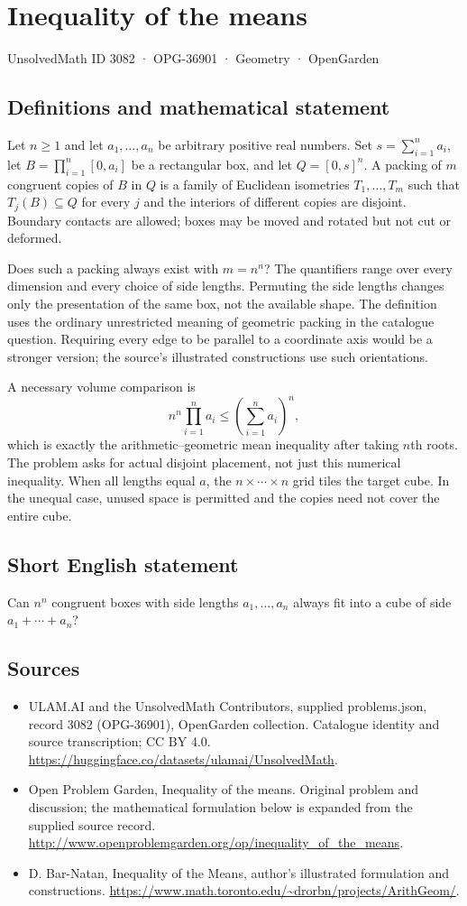 \documentclass[11pt,a4paper]{article}
\begin{document}
\section*{Inequality of the means}\label{3082}
{\small UnsolvedMath ID 3082 · OPG-36901 · Geometry · OpenGarden}
\subsection{Definitions and mathematical statement}
Let $n\ge1$ and let $a_1,\ldots,a_n$ be arbitrary positive real numbers.
Set $s=\sum_{i=1}^n a_i$, let
$B=\prod_{i=1}^n[0,a_i]$ be a rectangular box, and let $Q=[0,s]^n$.
A packing of $m$ congruent copies of $B$ in $Q$ is a family of Euclidean
isometries $T_1,\ldots,T_m$ such that $T_j(B)\subseteq Q$ for every $j$
and the interiors of different copies are disjoint. Boundary contacts
are allowed; boxes may be moved and rotated but not cut or deformed.

Does such a packing always exist with $m=n^n$? The quantifiers range
over every dimension and every choice of side lengths. Permuting the
side lengths changes only the presentation of the same box, not the
available shape. The definition uses the ordinary unrestricted meaning
of geometric packing in the catalogue question. Requiring every edge to
be parallel to a coordinate axis would be a stronger version; the source's
illustrated constructions use such orientations.

A necessary volume comparison is
\[
 n^n\prod_{i=1}^n a_i\le\left(\sum_{i=1}^n a_i\right)^n,
\]
which is exactly the arithmetic--geometric mean inequality after taking
$n$th roots. The problem asks for actual disjoint placement, not just this
numerical inequality. When all lengths equal $a$, the $n\times\cdots\times n$
grid tiles the target cube. In the unequal case, unused space is permitted
and the copies need not cover the entire cube.
\subsection{Short English statement}
Can $n^n$ congruent boxes with side lengths $a_1,\ldots,a_n$ always fit into a cube of side $a_1+\cdots+a_n$?
\subsection{Sources}
\begin{itemize}
\item[S1] ULAM.AI and the UnsolvedMath Contributors, supplied problems.json, record 3082 (OPG-36901), OpenGarden collection. Catalogue identity and source transcription; CC BY 4.0.
\url{https://huggingface.co/datasets/ulamai/UnsolvedMath}.
\item[S2] Open Problem Garden, Inequality of the means. Original problem and discussion; the mathematical formulation below is expanded from the supplied source record.
\url{http://www.openproblemgarden.org/op/inequality_of_the_means}.
\item[S3] D. Bar-Natan, Inequality of the Means, author’s illustrated formulation and constructions.
\url{https://www.math.toronto.edu/~drorbn/projects/ArithGeom/}.
\end{itemize}
\end{document}
